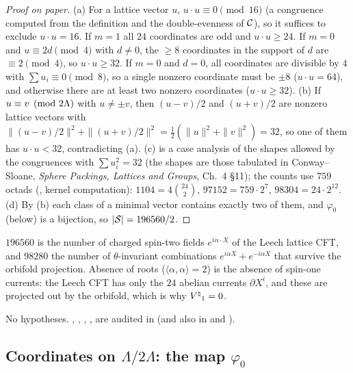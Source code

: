 \begin{proof}[Proof on paper]
(a) For a lattice vector $u$, $u\cdot u\equiv0\pmod{16}$ (a congruence computed from the
definition and the double-evenness of $\mathcal{C}$), so it suffices to exclude $u\cdot u=16$.  If $m=1$
all $24$ coordinates are odd and $u\cdot u\ge24$.  If $m=0$ and $u\equiv2d\pmod4$ with $d\ne0$, the
$\ge8$ coordinates in the support of $d$ are $\equiv2\pmod4$, so $u\cdot u\ge32$.  If $m=0$ and $d=0$,
all coordinates are divisible by $4$ with $\sum u_i\equiv0\pmod8$, so a single nonzero coordinate must
be $\pm8$ ($u\cdot u=64$), and otherwise there are at least two nonzero coordinates
($u\cdot u\ge32$).  (b) If $u\equiv v\pmod{2{\Lambda}}$ with $u\neq\pm v$, then $(u-v)/2$ and $(u+v)/2$ are
nonzero lattice vectors with $\|(u-v)/2\|^2+\|(u+v)/2\|^2=\tfrac12(\|u\|^2+\|v\|^2)=32$, so one of them
has $u\cdot u<32$, contradicting (a).  (c) is a case analysis of the shapes allowed by the
congruences with $\sum u_i^2=32$ (the shapes are those tabulated in Conway--Sloane, \emph{Sphere
Packings, Lattices and Groups}, Ch.~4 \S11); the counts use $759$ octads (, kernel computation):
$1104=4\binom{24}2$, $97152=759\cdot2^7$, $98304=24\cdot2^{12}$.  (d) By (b) each class of a minimal
vector contains exactly two of them, and $\varphi_0$ (below) is a bijection, so $|\mathcal{S}|=196560/2$.
\end{proof}
\begin{physics}
$196560$ is the number of charged spin-two fields $e^{i\alpha\cdot X}$ of the Leech lattice CFT, and
$98280$ the number of $\theta$-invariant combinations $e^{i\alpha X}+e^{-i\alpha X}$ that survive the
orbifold projection.  Absence of roots ($\langle\alpha,\alpha\rangle=2$) is the absence of
spin-one currents: the Leech CFT has only the $24$ abelian currents $\partial X^i$, and these are
projected out by the orbifold, which is why ${V^{\natural}}_1=0$.
\end{physics}
\begin{status}
No hypotheses.  , , , ,
 are audited in  (and  also in
 and ).
\end{status}

\subsection{Coordinates on \texorpdfstring{$\Lambda/2\Lambda$}{Lambda/2Lambda}: the map \texorpdfstring{$\varphi_0$}{phi0}}

